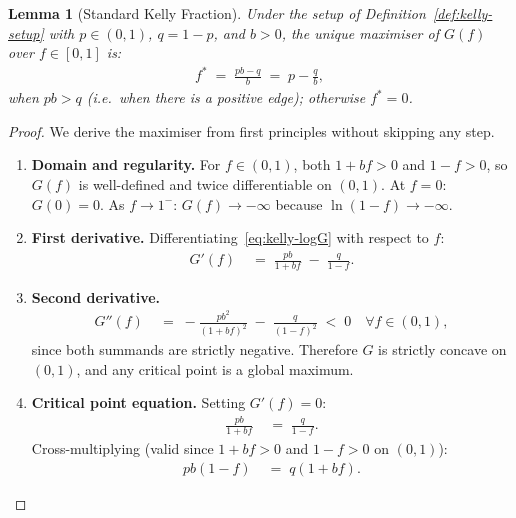\documentclass[12pt,openany]{book}
\numberwithin{equation}{chapter}
\theoremstyle{plain}
\newtheorem{lemma}[theorem]{Lemma}
\theoremstyle{definition}
\theoremstyle{remark}
\numberwithin{equation}{chapter}
\theoremstyle{plain}
\begin{document}
\begin{lemma}[Standard Kelly Fraction]
\label{lem:standard-kelly}
Under the setup of Definition~\ref{def:kelly-setup} with
$p \in (0,1)$, $q = 1-p$, and $b > 0$, the unique maximiser of
$G(f)$ over $f \in [0,1]$ is:
\begin{align}
  f^* \;=\; \frac{pb - q}{b}
  \;=\; p - \frac{q}{b},
  \label{eq:standard-kelly-fraction}
\end{align}
when $pb > q$ (i.e.\ when there is a positive edge); otherwise
$f^* = 0$.
\end{lemma}

\begin{proof}
We derive the maximiser from first principles without skipping
any step.
\begin{enumerate}
  \item[\textup{(1)}] \textbf{Domain and regularity.}
        For $f \in (0,1)$, both $1 + bf > 0$ and $1 - f > 0$,
        so $G(f)$ is well-defined and twice differentiable on
        $(0,1)$.  At $f = 0$: $G(0) = 0$.
        As $f \to 1^-$: $G(f) \to -\infty$ because
        $\ln(1-f) \to -\infty$.

  \item[\textup{(2)}] \textbf{First derivative.}
        Differentiating~\eqref{eq:kelly-logG} with respect to
        $f$:
        \begin{align}
          G'(f)
          &\;=\; \frac{pb}{1 + bf}
                 \;-\; \frac{q}{1 - f}.
          \label{eq:kelly-G-prime}
        \end{align}

  \item[\textup{(3)}] \textbf{Second derivative.}
        \begin{align}
          G''(f)
          &\;=\; -\frac{pb^2}{(1+bf)^2}
                 \;-\; \frac{q}{(1-f)^2}
          \;<\; 0
          \quad \forall f \in (0,1),
          \label{eq:kelly-G-double-prime}
        \end{align}
        since both summands are strictly negative.
        Therefore $G$ is strictly concave on $(0,1)$, and
        any critical point is a global maximum.

  \item[\textup{(4)}] \textbf{Critical point equation.}
        Setting $G'(f) = 0$:
        \begin{align}
          \frac{pb}{1 + bf}
          &\;=\; \frac{q}{1 - f}.
          \label{eq:kelly-critical}
        \end{align}
        Cross-multiplying (valid since $1+bf > 0$ and
        $1-f > 0$ on $(0,1)$):
        \begin{align}
          pb(1 - f)
          &\;=\; q(1 + bf).
          \label{eq:kelly-cross}
        \end{align}


\end{enumerate}
\end{proof}
\end{document}
